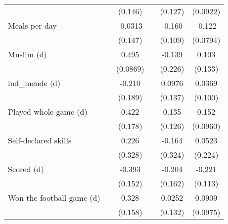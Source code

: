 {\begin{tabular}{l*{5}{c}}
                    &                     &     (0.146)         &                     &     (0.127)         &    (0.0922)         \\
[1em]
Meals per day       &                     &     -0.0313         &                     &      -0.160         &      -0.122         \\
                    &                     &     (0.147)         &                     &     (0.109)         &    (0.0794)         \\
[1em]
Muslim (d)          &                     &       0.495\sym{***}&                     &      -0.139         &       0.103         \\
                    &                     &    (0.0869)         &                     &     (0.226)         &     (0.133)         \\
[1em]
ind\_mende (d)       &                     &      -0.210         &                     &      0.0976         &      0.0369         \\
                    &                     &     (0.189)         &                     &     (0.137)         &     (0.100)         \\
[1em]
Played whole game (d)&                     &       0.422\sym{**} &                     &       0.135         &       0.152         \\
                    &                     &     (0.178)         &                     &     (0.126)         &    (0.0960)         \\
[1em]
Self-declared skills&                     &       0.226         &                     &      -0.164         &      0.0523         \\
                    &                     &     (0.328)         &                     &     (0.324)         &     (0.224)         \\
[1em]
Scored (d)          &                     &      -0.393\sym{***}&                     &      -0.204         &      -0.221\sym{*}  \\
                    &                     &     (0.152)         &                     &     (0.162)         &     (0.113)         \\
[1em]
Won the football game (d)&                     &       0.328\sym{**} &                     &      0.0252         &      0.0909         \\
                    &                     &     (0.158)         &                     &     (0.132)         &    (0.0975)         \\

\end{tabular}}
